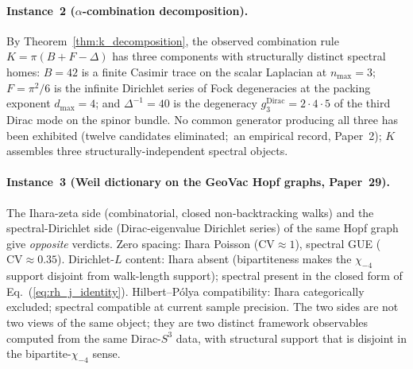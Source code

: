 \documentclass[aps,pra,twocolumn,superscriptaddress,longbibliography]{revtex4-2}
\begin{document}
\paragraph{Instance~2 ($\alpha$-combination decomposition).}  By
Theorem~\ref{thm:k_decomposition}, the observed combination rule
$K = \pi(B + F - \Delta)$ has three components with structurally
distinct spectral homes: $B = 42$ is a finite Casimir trace on the
scalar Laplacian at $n_{\max} = 3$; $F = \pi^2/6$ is the infinite Dirichlet
series of Fock degeneracies at the packing exponent
$d_{\max} = 4$; and $\Delta^{-1} = 40$ is the degeneracy
$g_3^{\mathrm{Dirac}} = 2 \cdot 4 \cdot 5$ of the third Dirac mode on
the spinor bundle.  No common generator producing all three has been
exhibited (twelve candidates eliminated;\ an empirical record, Paper~2); $K$
assembles three structurally-independent spectral objects.

\paragraph{Instance~3 (Weil dictionary on the GeoVac Hopf graphs,
Paper~29).}  The Ihara-zeta side (combinatorial, closed
non-backtracking walks) and the spectral-Dirichlet side
(Dirac-eigenvalue Dirichlet series) of the same
Hopf graph~\cite{loutey_paper29} give \emph{opposite} verdicts.
Zero spacing: Ihara Poisson ($\mathrm{CV} \approx 1$), spectral
GUE ($\mathrm{CV} \approx 0.35$).  Dirichlet-$L$ content: Ihara
absent (bipartiteness makes the $\chi_{-4}$ support disjoint from
walk-length support); spectral present in the closed form of
Eq.~(\ref{eq:rh_j_identity}).  Hilbert--P\'olya compatibility:
Ihara categorically excluded; spectral compatible at current sample
precision.  The two sides are not two views of the same object;
they are two distinct framework observables computed from the
same Dirac-$S^3$ data, with structural support that is disjoint
in the bipartite-$\chi_{-4}$ sense.
\end{document}
